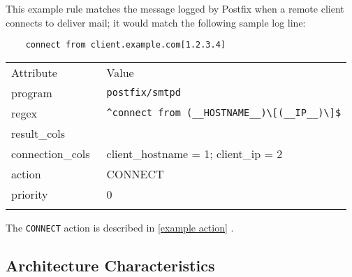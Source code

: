 \documentclass[draft]{svmult}
\newcommand{\sectionref}[1]{%
    \textsection{}\vref*{#1}%
}
\newcommand{\daemon}[1]{%
    \texttt{postfix/#1}%
}
\begin{document}
\label{example rule}

This example rule matches the message logged by Postfix when a remote
client connects to deliver mail; it would match the following sample log
line:

\begin{verbatim}
    connect from client.example.com[1.2.3.4]
\end{verbatim}

\begin{tabular}[]{ll}
    \hline
    \noalign{\smallskip}
    Attribute                 & Value                                            \\
    \noalign{\smallskip}
    \hline
    \noalign{\smallskip}
    program                   & \daemon{smtpd}                                   \\
    regex                     & \verb!^connect from (__HOSTNAME__)\[(__IP__)\]$! \\
    result\_cols              &                                                  \\
    connection\_cols~\empty{} & client\_hostname = 1; client\_ip = 2             \\
    action                    & CONNECT                                          \\
    priority                  & 0                                                \\
    \noalign{\smallskip}
    \hline
    \noalign{\smallskip}
\end{tabular}

\noindent{}The \texttt{CONNECT} action is described in \sectionref{example
action}.


\subsection{Architecture Characteristics}

\label{Architecture characteristics}
\end{document}
